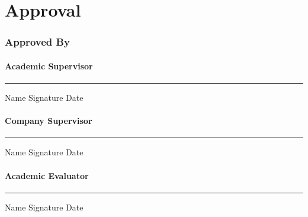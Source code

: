 \chapter*{Approval}
\thispagestyle{plain}

\vspace{1.4cm}
\subsection*{\LARGE Approved By} \normalsize
\vspace{1.4cm}
\subsubsection*{Academic Supervisor}
\vspace{2cm}

\vspace{0.2cm}
\hrule
\vspace{0.2cm}
\noindent Name \hspace{7cm} Signature \hspace{3cm} Date
\subsubsection*{Company Supervisor}
\vspace{2cm}

\vspace{0.2cm}
\hrule
\vspace{0.2cm}
\noindent Name \hspace{7cm} Signature \hspace{3cm} Date
\subsubsection*{Academic Evaluator}
\vspace{2cm}
\hrule
\vspace{0.2cm}
\noindent Name \hspace{7cm} Signature \hspace{3cm} Date